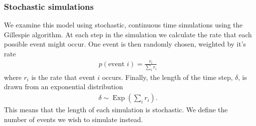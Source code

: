 \subsubsection{Stochastic simulations}

We examine this model using stochastic, continuous time simulations using the Gillespie algorithm.
At each step in the simulation we calculate the rate that each possible event might occur.
One event is then randomly chosen, weighted by it's rate
\begin{align}
  p(\text{event } i) = \frac{r_i}{\sum_i r_i}
\end{align}
where $r_i$ is the rate that event $i$ occurs.
Finally, the length of the time step, $\delta$, is drawn from an exponential distribution 
\begin{align}
  \delta \sim \operatorname{Exp}\left(\sum_i r_i  \right).
\end{align}
This means that the length of each simulation is stochastic. 
We define the number of events we wish to simulate instead.

